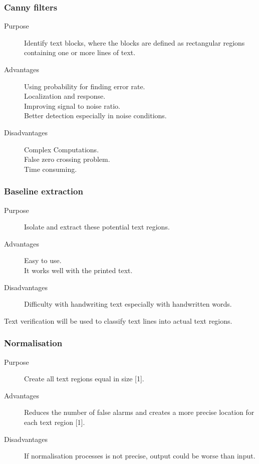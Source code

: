 \documentclass[a4paper,12pt]{article}
\begin{document}
\subsubsection{Canny filters}
\begin{description}

\item[Purpose] Identify text blocks, where the blocks are defined as rectangular regions containing one or more lines of text.\cite{vocr_recall}
\item[Advantages] Using probability for finding error rate.
\\ Localization and response.\cite{vocr_gurmukhi}
\\ Improving signal to noise ratio.\cite{vocr_gurmukhi}
\\ Better detection especially in noise conditions.\cite{vocr_gurmukhi}
\item[Disadvantages] Complex Computations.
\\ False zero crossing problem.
\\ Time consuming.\cite{vocr_gurmukhi}
\end{description}

\subsubsection{Baseline extraction}
\begin{description}
\item[Purpose] Isolate and extract these potential text regions.
\item[Advantages] Easy to use.
\\ It works well with the printed text.\cite{vocr_base}
\item[Disadvantages] Difficulty with handwriting text especially with handwritten words.\cite{vocr_base}
\end{description}


Text verification will be used to classify text lines into actual text regions.
\subsubsection{Normalisation}
\begin{description}
\item[Purpose] Create all text regions equal in size [1].
\item[Advantages] Reduces the number of false alarms and creates a more precise location for each text region [1].
\item[Disadvantages] If normalisation processes is not precise, output could be worse than input.
\end{description}
\end{document}
